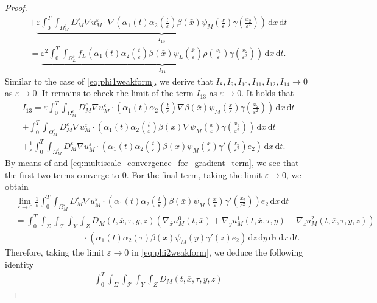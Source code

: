 \documentclass[11pt]{article}
\def\es{\varepsilon}
\def\omm{\Omega_M^\varepsilon}
\def\oll{\Omega_L^\varepsilon}
\def\T{\mathcal{T}}
\newcommand{\di}[1]{\,\mathrm{d}#1}
\begin{document}
\begin{proof}
\begin{multline}
    +\underbrace{ \es\int_0^T\int_{\omm}  D_M^\es  \nabla u_M^\es\cdot\nabla (\alpha_1(t)\alpha_2(\frac{t}{\es})\beta(\bar x) \psi_M(\frac{x}{\es})\gamma(\frac{x_2}{\es^2})) \di{x}\di{t}}_{I_{13}}\\
    = \underbrace{\es^2 \int_0^T\int_{\oll} f_L(\alpha_1(t)\alpha_2(\frac{t}{\es})\beta(\bar x) \psi_L(\frac{\bar x}{\es})\rho(\frac{x_1}{\es})\gamma(\frac{x_2}{\es^2})) \di{x}\di{t}}_{I_{14}}.
\end{multline}
Similar to the case of \eqref{eq:phi1weakform}, we derive that $I_8,I_9,I_{10},I_{11},I_{12},I_{14}\rightarrow 0$ as $\es\rightarrow 0$. It remains to check the limit of the term $I_{13}$ as $\es\rightarrow 0$.  It holds that
\begin{multline*}
    I_{13}= \es\int_0^T\int_{\omm}  D_M^\es  \nabla u_M^\es\cdot (\alpha_1(t)\alpha_2(\frac{t}{\es})\nabla\beta(\bar x) \psi_M(\frac{x}{\es})\gamma(\frac{x_2}{\es^2})) \di{x}\di{t}\\
    +\int_0^T\int_{\omm}  D_M^\es  \nabla u_M^\es\cdot (\alpha_1(t)\alpha_2(\frac{t}{\es})\beta(\bar x) \nabla\psi_M(\frac{x}{\es})\gamma(\frac{x_2}{\es^2})) \di{x}\di{t}\\
    +\frac1\es\int_0^T\int_{\omm}  D_M^\es  \nabla u_M^\es\cdot (\alpha_1(t)\alpha_2(\frac{t}{\es})\beta(\bar x) \psi_M(\frac{x}{\es})\gamma'(\frac{x_2}{\es^2})e_2) \di{x}\di{t}.
\end{multline*}
By means of  and \eqref{eq:multiscale_convergence_for_gradient_term}, we see that the first two terms converge to $0$. For the final term, taking the limit $\es\rightarrow 0$, we obtain
\begin{align*}
    &\!\!\!\!\lim_{\es\rightarrow 0}\frac1\es\int_0^T\int_{\omm}  D_M^\es  \nabla u_M^\es\cdot (\alpha_1(t)\alpha_2(\frac{t}{\es})\beta(\bar x) \psi_M(\frac{x}{\es})\gamma'(\frac{x_2}{\es^2})) e_2\di{x}\di{t}\\
    &=\int_0^T\int_{\Sigma}\int_\T\int_{Y}\int_Z   D_M(t,\overline{x},\tau,y,z)
    \left( \nabla_{\overline{x}}u_M^0(t,\overline{x})+\nabla_y u_M^1(t,\overline{x},\tau,y)+\nabla_zu_M^2(t,\overline{x},\tau,y,z)\right)\\
    &\qquad\qquad\qquad\qquad \cdot ( \alpha_1(t)\alpha_2(\tau)\beta(\bar x) \psi_M(y)\gamma'(z)e_2) \di{z}\di{y}\di{\tau}\di{x}\di{t}.
\end{align*}
Therefore, taking the limit $\es\rightarrow 0$ in \eqref{eq:phi2weakform}, we deduce the following identity
\begin{multline*}
    \int_0^T\int_{\Sigma}\int_\T\int_{Y}\int_Z   D_M(t,\overline{x},\tau,y,z)

\end{multline*}
\end{proof}
\end{document}
